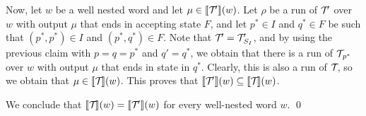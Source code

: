 	Now, let $w$ be a well nested word and let $\mu\in {\llbracket{\mathcal{T}\!'}\rrbracket}(w)$.
	Let $\rho$ be a run of $\mathcal{T}\!'$ over $w$ with output $\mu$ that ends in accepting state $F$, and let $p^*\in I$ and $q^*\in F$ be such that $(p^*,p^*)\in I$ and $(p^*,q^*)\in F$. Note that $\mathcal{T}\!' = \mathcal{T}\!'_{S_I}$, and by using the previous claim with $p = q = p^*$ and $q' = q^*$, we obtain that there is a run of $\mathcal{T}\!_{p^*}$ over $w$ with output $\mu$ that ends in state in $q^*$. Clearly, this is also a run of $\mathcal{T}\!$, so we obtain that $\mu\in{\llbracket{\mathcal{T}\!}\rrbracket}(w)$. 
	This proves that $\llbracket \mathcal{T}\!' \rrbracket(w) \subseteq \llbracket \mathcal{T}\! \rrbracket(w)$.
	
	We conclude that $\llbracket \mathcal{T}\! \rrbracket(w) = \llbracket \mathcal{T}\!' \rrbracket(w)$ for every well-nested word $w$. \hfill \qed